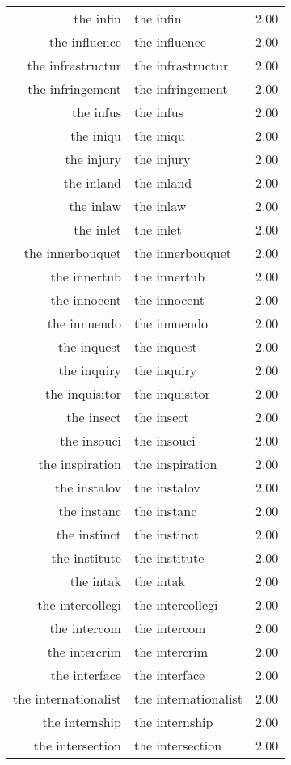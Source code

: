 \begin{table}[ht]
\begin{tabular}{rlr}
  the infin & the infin & 2.00 \\ 
  the influence & the influence & 2.00 \\ 
  the infrastructur & the infrastructur & 2.00 \\ 
  the infringement & the infringement & 2.00 \\ 
  the infus & the infus & 2.00 \\ 
  the iniqu & the iniqu & 2.00 \\ 
  the injury & the injury & 2.00 \\ 
  the inland & the inland & 2.00 \\ 
  the inlaw & the inlaw & 2.00 \\ 
  the inlet & the inlet & 2.00 \\ 
  the innerbouquet & the innerbouquet & 2.00 \\ 
  the innertub & the innertub & 2.00 \\ 
  the innocent & the innocent & 2.00 \\ 
  the innuendo & the innuendo & 2.00 \\ 
  the inquest & the inquest & 2.00 \\ 
  the inquiry & the inquiry & 2.00 \\ 
  the inquisitor & the inquisitor & 2.00 \\ 
  the insect & the insect & 2.00 \\ 
  the insouci & the insouci & 2.00 \\ 
  the inspiration & the inspiration & 2.00 \\ 
  the instalov & the instalov & 2.00 \\ 
  the instanc & the instanc & 2.00 \\ 
  the instinct & the instinct & 2.00 \\ 
  the institute & the institute & 2.00 \\ 
  the intak & the intak & 2.00 \\ 
  the intercollegi & the intercollegi & 2.00 \\ 
  the intercom & the intercom & 2.00 \\ 
  the intercrim & the intercrim & 2.00 \\ 
  the interface & the interface & 2.00 \\ 
  the internationalist & the internationalist & 2.00 \\ 
  the internship & the internship & 2.00 \\ 
  the intersection & the intersection & 2.00 \\ 

\end{tabular}
\end{table}
